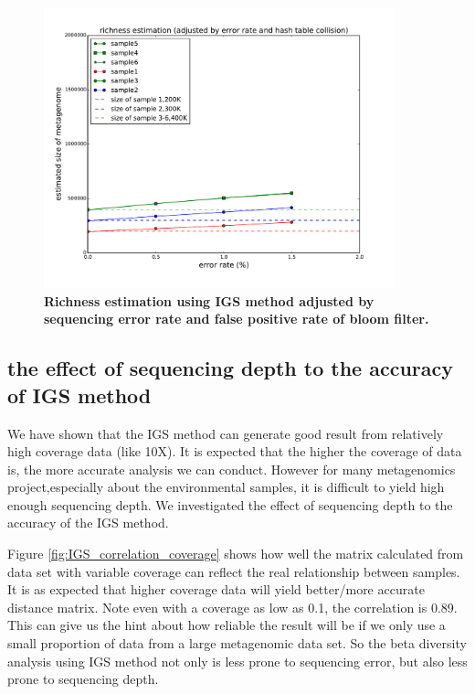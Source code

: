 \begin{figure}[!ht]
 \centerline{\includegraphics[width=4in]{./figures/alpha_by_error_full_adjust.pdf}}
\caption{\bf Richness estimation using IGS method adjusted by sequencing error
rate and false positive rate of bloom filter.}
\label{fig:IGS_richness_adjustment}
\end{figure}


\subsection{the effect of sequencing depth to the accuracy of IGS method}


We have shown that the IGS method can generate good result from relatively
high coverage data (like 10X). It is expected that the higher the coverage
of data is, the more accurate analysis we can conduct. However for many 
metagenomics project,especially about the environmental samples, it is difficult
to yield high enough sequencing depth. We investigated the effect of 
sequencing depth to the accuracy of the IGS method.


Figure \ref{fig:IGS_correlation_coverage} shows how well the matrix 
calculated from data set with variable coverage can 
reflect the real relationship between samples. It is as expected that 
higher coverage data will yield better/more accurate distance matrix.
Note even with a coverage as low as 0.1, the correlation is 0.89. 
This can  give us the hint about how reliable the result will be if 
we only use a small proportion of data from a large metagenomic data set.
So the beta diversity analysis using IGS method not only is less prone to
sequencing error, but also less prone to sequencing depth.




